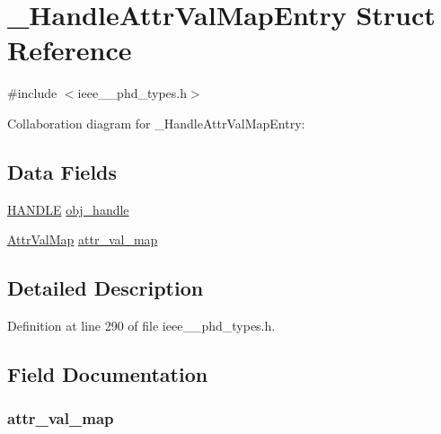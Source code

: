 \hypertarget{struct___handle_attr_val_map_entry}{}\section{\+\_\+\+Handle\+Attr\+Val\+Map\+Entry Struct Reference}
\label{struct___handle_attr_val_map_entry}


{\ttfamily \#include $<$ieee\+\_\+\_\+phd\+\_\+types.\+h$>$}



Collaboration diagram for \+\_\+\+Handle\+Attr\+Val\+Map\+Entry\+:
\subsection*{Data Fields}
\begin{DoxyCompactItemize}
\item 
\hyperlink{ieee__11073__phd__types_8h_a76f0d44d294babf2e568f7ee676ffca6}{H\+A\+N\+D\+L\+E} \hyperlink{struct___handle_attr_val_map_entry_abbfff52b7a4956021522f5750c4b32c6}{obj\+\_\+handle}
\item 
\hyperlink{ieee__11073__phd__types_8h_ab20bcd780b908d5c4042de115e0af8d7}{Attr\+Val\+Map} \hyperlink{struct___handle_attr_val_map_entry_af0de5a153ac1e3ed23cc9a8010d054fc}{attr\+\_\+val\+\_\+map}
\end{DoxyCompactItemize}


\subsection{Detailed Description}


Definition at line 290 of file ieee\+\_\+\_\+phd\+\_\+types.\+h.



\subsection{Field Documentation}
\hypertarget{struct___handle_attr_val_map_entry_af0de5a153ac1e3ed23cc9a8010d054fc}{}
\subsubsection[{attr\+\_\+val\+\_\+map}]{ attr\+\_\+val\+\_\+map}\label{struct___handle_attr_val_map_entry_af0de5a153ac1e3ed23cc9a8010d054fc}


